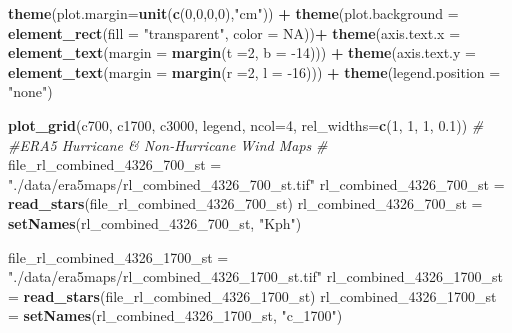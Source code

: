 \documentclass[12pt,oneside]{reedthesis}
\newenvironment{Shaded}{\begin{snugshade}}{\end{snugshade}}
\newcommand{\CommentTok}[1]{\textcolor[rgb]{0.56,0.35,0.01}{\textit{#1}}}
\newcommand{\DataTypeTok}[1]{\textcolor[rgb]{0.13,0.29,0.53}{#1}}
\newcommand{\DecValTok}[1]{\textcolor[rgb]{0.00,0.00,0.81}{#1}}
\newcommand{\FloatTok}[1]{\textcolor[rgb]{0.00,0.00,0.81}{#1}}
\newcommand{\KeywordTok}[1]{\textcolor[rgb]{0.13,0.29,0.53}{\textbf{#1}}}
\newcommand{\NormalTok}[1]{#1}
\newcommand{\OperatorTok}[1]{\textcolor[rgb]{0.81,0.36,0.00}{\textbf{#1}}}
\newcommand{\OtherTok}[1]{\textcolor[rgb]{0.56,0.35,0.01}{#1}}
\newcommand{\StringTok}[1]{\textcolor[rgb]{0.31,0.60,0.02}{#1}}
\begin{document}
\begin{Shaded}
\begin{Highlighting}[]
\StringTok{  }\KeywordTok{theme}\NormalTok{(}\DataTypeTok{plot.margin=}\KeywordTok{unit}\NormalTok{(}\KeywordTok{c}\NormalTok{(}\DecValTok{0}\NormalTok{,}\DecValTok{0}\NormalTok{,}\DecValTok{0}\NormalTok{,}\DecValTok{0}\NormalTok{),}\StringTok{"cm"}\NormalTok{)) }\OperatorTok{+}
\StringTok{  }\KeywordTok{theme}\NormalTok{(}\DataTypeTok{plot.background =} \KeywordTok{element_rect}\NormalTok{(}\DataTypeTok{fill =} \StringTok{"transparent"}\NormalTok{, }\DataTypeTok{color =} \OtherTok{NA}\NormalTok{))}\OperatorTok{+}
\StringTok{  }\KeywordTok{theme}\NormalTok{(}\DataTypeTok{axis.text.x =} \KeywordTok{element_text}\NormalTok{(}\DataTypeTok{margin =}  \KeywordTok{margin}\NormalTok{(}\DataTypeTok{t =}\DecValTok{2}\NormalTok{, }\DataTypeTok{b =} \DecValTok{-14}\NormalTok{))) }\OperatorTok{+}\StringTok{ }
\StringTok{  }\KeywordTok{theme}\NormalTok{(}\DataTypeTok{axis.text.y =} \KeywordTok{element_text}\NormalTok{(}\DataTypeTok{margin =}  \KeywordTok{margin}\NormalTok{(}\DataTypeTok{r =}\DecValTok{2}\NormalTok{, }\DataTypeTok{l =} \DecValTok{-16}\NormalTok{))) }\OperatorTok{+}
\StringTok{  }\KeywordTok{theme}\NormalTok{(}\DataTypeTok{legend.position =} \StringTok{"none"}\NormalTok{)}

\KeywordTok{plot_grid}\NormalTok{(c700, c1700, c3000, legend, }\DataTypeTok{ncol=}\DecValTok{4}\NormalTok{, }\DataTypeTok{rel_widths=}\KeywordTok{c}\NormalTok{(}\DecValTok{1}\NormalTok{, }\DecValTok{1}\NormalTok{, }\DecValTok{1}\NormalTok{, }\FloatTok{0.1}\NormalTok{))}
\CommentTok{#}
\CommentTok{#ERA5 Hurricane & Non-Hurricane Wind Maps}
\CommentTok{#}
\NormalTok{file_rl_combined_}\DecValTok{4326}\NormalTok{_}\DecValTok{700}\NormalTok{_st =}\StringTok{ "./data/era5maps/rl_combined_4326_700_st.tif"}
\NormalTok{rl_combined_}\DecValTok{4326}\NormalTok{_}\DecValTok{700}\NormalTok{_st =}\StringTok{ }\KeywordTok{read_stars}\NormalTok{(file_rl_combined_}\DecValTok{4326}\NormalTok{_}\DecValTok{700}\NormalTok{_st)}
\NormalTok{rl_combined_}\DecValTok{4326}\NormalTok{_}\DecValTok{700}\NormalTok{_st =}\StringTok{ }\KeywordTok{setNames}\NormalTok{(rl_combined_}\DecValTok{4326}\NormalTok{_}\DecValTok{700}\NormalTok{_st, }\StringTok{"Kph"}\NormalTok{)}

\NormalTok{file_rl_combined_}\DecValTok{4326}\NormalTok{_}\DecValTok{1700}\NormalTok{_st =}\StringTok{ "./data/era5maps/rl_combined_4326_1700_st.tif"}
\NormalTok{rl_combined_}\DecValTok{4326}\NormalTok{_}\DecValTok{1700}\NormalTok{_st =}\StringTok{ }\KeywordTok{read_stars}\NormalTok{(file_rl_combined_}\DecValTok{4326}\NormalTok{_}\DecValTok{1700}\NormalTok{_st)}
\NormalTok{rl_combined_}\DecValTok{4326}\NormalTok{_}\DecValTok{1700}\NormalTok{_st =}\StringTok{ }\KeywordTok{setNames}\NormalTok{(rl_combined_}\DecValTok{4326}\NormalTok{_}\DecValTok{1700}\NormalTok{_st, }\StringTok{"c_1700"}\NormalTok{)}


\end{Highlighting}
\end{Shaded}
\end{document}

